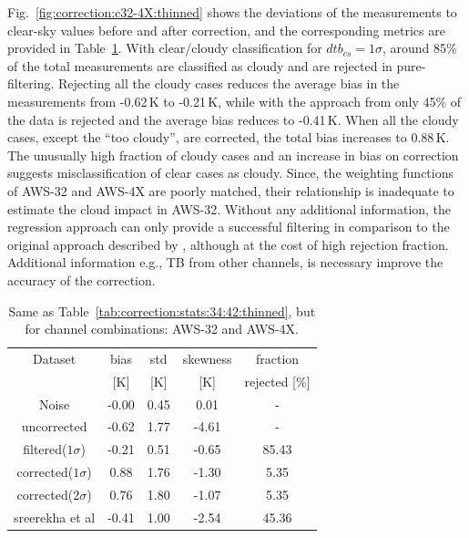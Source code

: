 \documentclass[12pt]{article}
\begin{document}
Fig.~\ref{fig:correction:c32-4X:thinned} shows the deviations of the
measurements to clear-sky values before and after correction, and the
corresponding metrics are provided in Table~\ref{tab:correction:stats:32:4X}.
With clear/cloudy classification for $dtb_{cs} = 1\sigma$, around 85\% of the
total measurements are classified as cloudy and are rejected in pure-filtering.
Rejecting all the cloudy cases reduces the average bias in the measurements
from -0.62\,K to -0.21\,K, while with the approach from
\citet{rekha2012potential} only 45\% of the data is rejected and the average
bias reduces to -0.41\,K. When all the cloudy cases, except the ``too cloudy'',
are corrected, the total bias increases to 0.88\,K. The unusually high fraction
of cloudy cases and an increase in bias on correction suggests misclassification
of clear cases as cloudy. Since, the weighting functions of AWS-32 and AWS-4X
are poorly matched, their relationship is inadequate to estimate the cloud
impact in AWS-32. Without any additional information, the regression approach
can only provide a successful filtering in comparison to the original approach
described by \citet{rekha2012potential}, although at the cost of high rejection
fraction. Additional information e.g., TB from other channels, is necessary
improve the accuracy of the correction.

\begin{table}[!h]
	\centering
	\begin{tabular}[b]{c|c|c|c|c}
		Dataset  		  &   bias &   std & skewness & fraction \\
						&   [K]  &   [K] & [K] 		& rejected [\%]\\
		\hline
Noise             		&  -0.00 &  0.45 &               0.01 &                - \\
uncorrected       		&  -0.62 &  1.77 &              -4.61 &                - \\
filtered($1\sigma$)  	&  -0.21 &  0.51 &              -0.65 &               85.43 \\
corrected($1\sigma$) 	&   0.88 &  1.76 &              -1.30 &                5.35 \\
corrected($2\sigma$) 	&   0.76 &  1.80 &              -1.07 &                5.35 \\
sreerekha et al   		&  -0.41 &  1.00 &              -2.54 &               45.36 \\
		\hline
	\end{tabular}
	\caption{Same as Table~\ref{tab:correction:stats:34:42:thinned}, but for channel combinations: AWS-32 and AWS-4X.   }
	\label{tab:correction:stats:32:4X}
\end{table}
\end{document}
